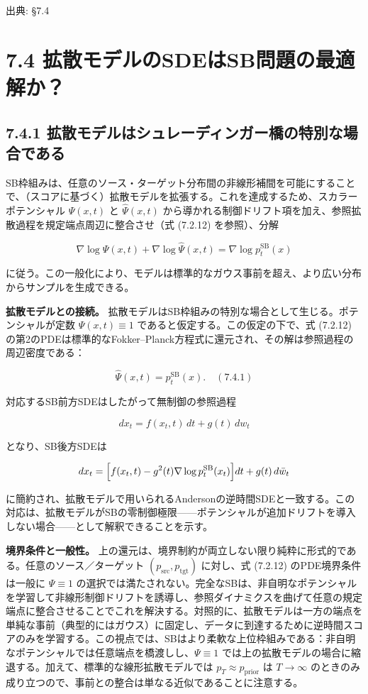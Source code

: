 

{\color{gray}\footnotesize 出典: §7.4\par}
\vspace{0.2em}

\section*{7.4 拡散モデルのSDEはSB問題の最適解か？}


\subsection*{7.4.1 拡散モデルはシュレーディンガー橋の特別な場合である}


SB枠組みは、任意のソース・ターゲット分布間の非線形補間を可能にすることで、（スコアに基づく）拡散モデルを拡張する。これを達成するため、スカラーポテンシャル $\Psi(x,t)$ と $\widehat{\Psi}(x,t)$ から導かれる制御ドリフト項を加え、参照拡散過程を規定端点周辺に整合させ（式 (7.2.12) を参照）、分解

\[
\nabla\log\Psi(x,t)+\nabla\log\widehat{\Psi}(x,t)=\nabla\log p_t^{\mathrm{SB}}(x)
\]


に従う。この一般化により、モデルは標準的なガウス事前を超え、より広い分布からサンプルを生成できる。

\textbf{拡散モデルとの接続。} 拡散モデルはSB枠組みの特別な場合として生じる。ポテンシャルが定数 $\Psi(x,t)\equiv 1$ であると仮定する。この仮定の下で、式 (7.2.12) の第2のPDEは標準的なFokker–Planck方程式に還元され、その解は参照過程の周辺密度である：

\[
\widehat{\Psi}(x,t)=p_t^{\mathrm{SB}}(x). \quad (7.4.1)
\]


対応するSB前方SDEはしたがって無制御の参照過程

\[
dx_t=f(x_t,t)\,dt+g(t)\,dw_t
\]


となり、SB後方SDEは

\[
dx_t=\Bigl[f(x_t,t)-g^2(t)\nabla\log p_t^{\mathrm{SB}}(x_t)\Bigr]dt+g(t)\,d\bar{w}_t
\]


に簡約され、拡散モデルで用いられるAndersonの逆時間SDEと一致する。この対応は、拡散モデルがSBの零制御極限——ポテンシャルが追加ドリフトを導入しない場合——として解釈できることを示す。

\textbf{境界条件と一般性。} 上の還元は、境界制約が両立しない限り純粋に形式的である。任意のソース／ターゲット $(p_{\mathrm{src}},p_{\mathrm{tgt}})$ に対し、式 (7.2.12) のPDE境界条件は一般に $\Psi\equiv 1$ の選択では満たされない。完全なSBは、非自明なポテンシャルを学習して非線形制御ドリフトを誘導し、参照ダイナミクスを曲げて任意の規定端点に整合させることでこれを解決する。対照的に、拡散モデルは一方の端点を単純な事前（典型的にはガウス）に固定し、データに到達するために逆時間スコアのみを学習する。この視点では、SBはより柔軟な上位枠組みである：非自明なポテンシャルでは任意端点を橋渡しし、$\Psi\equiv 1$ では上の拡散モデルの場合に縮退する。加えて、標準的な線形拡散モデルでは $p_T\approx p_{\mathrm{prior}}$ は $T\to\infty$ のときのみ成り立つので、事前との整合は単なる近似であることに注意する。

